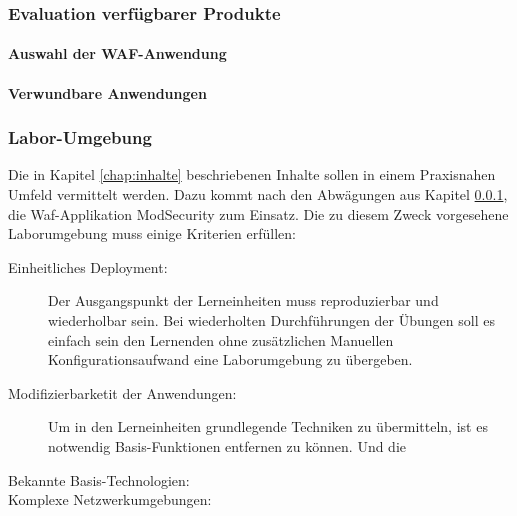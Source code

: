 \subsubsection{Evaluation verfügbarer Produkte}
\label{chap:produkt-eval}
\paragraph{Auswahl der \ac{WAF}-Anwendung}

\paragraph{Verwundbare Anwendungen}

\subsubsection{Labor-Umgebung}


Die in Kapitel \ref{chap:inhalte} beschriebenen Inhalte sollen in einem Praxisnahen Umfeld vermittelt werden.
Dazu kommt nach den Abwägungen aus Kapitel \ref{chap:produkt-eval}, die Waf-Applikation ModSecurity zum Einsatz.
Die zu diesem Zweck vorgesehene Laborumgebung muss einige Kriterien erfüllen:
\begin{description}
    \item[Einheitliches Deployment:]  Der Ausgangspunkt der Lerneinheiten muss reproduzierbar und wiederholbar sein. Bei wiederholten Durchführungen der Übungen soll es einfach sein den Lernenden ohne zusätzlichen Manuellen Konfigurationsaufwand eine Laborumgebung zu übergeben.
    \item[Modifizierbarketit der Anwendungen:] Um in den Lerneinheiten grundlegende Techniken zu übermitteln, ist es notwendig Basis-Funktionen entfernen zu können. Und die 
    \item[Bekannte Basis-Technologien:]
    \item[Komplexe Netzwerkumgebungen:]
\end{description}

